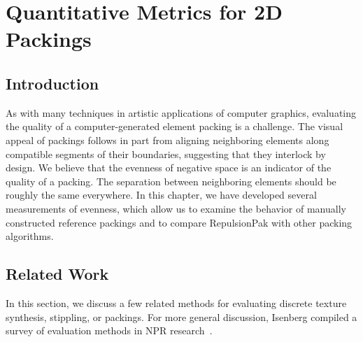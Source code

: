 
\chapter{Quantitative Metrics for 2D Packings}
\label{chapter_qualitative_metrics}


\section{Introduction}


\newtext
{
As with many techniques in artistic applications of computer graphics, evaluating the
quality of a computer-generated element packing is a challenge.
The visual appeal of packings follows in part from aligning neighboring elements along compatible 
segments of their boundaries, suggesting that they interlock by design. 
We believe that the evenness of negative space is an indicator 
of the quality of a packing.
The separation between neighboring elements should be roughly the same everywhere.
In this chapter, we have developed several measurements of evenness,
which allow us to examine the behavior of manually constructed reference
packings and to compare RepulsionPak with other packing algorithms.
}

\section{Related Work}


\newtext
{
In this section, we discuss a few related methods for evaluating discrete texture synthesis,
stippling, or packings.
For more general discussion, Isenberg compiled a survey of evaluation methods in NPR research~\cite{Isenberg2013}.
}

